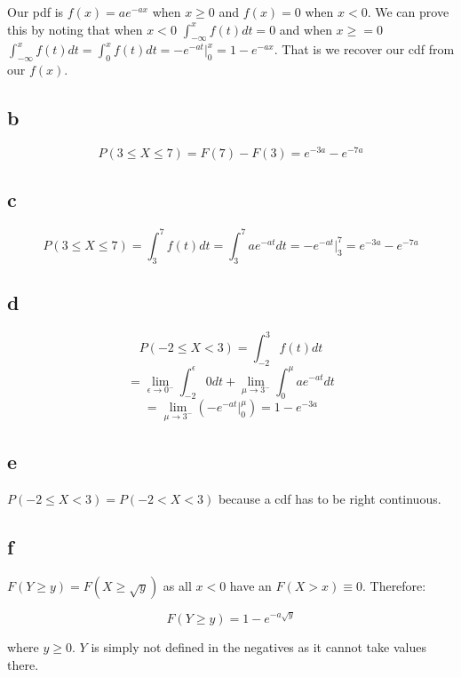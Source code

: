 \documentclass[11pt]{article}
\begin{document}
Our pdf is $f(x) = ae^{-ax}$ when $x\geq 0$ and $f(x) = 0$ when $x<0$. We can prove this by noting that when $x<0$ $\int_{-\infty}^x f(t)dt=0$ and when $x\geq = 0$ $\int_{-\infty}^x f(t)dt = \int_{0}^x f(t)dt = -e^{-at} |_0^{x} = 1 - e^{-ax}$. That is we recover our cdf from our $f(x)$. 

\subsection{b}

$$P(3 \leq X \leq 7) = F(7) - F(3) = e^{-3a}-e^{-7a}$$

\subsection{c}

$$P(3 \leq X \leq 7) = \int_3^7 f(t)dt = \int_3^7 ae^{-at} dt = -e^{-at}\Big|_3^{7}=e^{-3a}-e^{-7a}$$

\subsection{d}

$$P(-2 \leq X < 3) = \int_{-2}^3 f(t)dt$$ 
$$ = \lim_{\epsilon \rightarrow 0^-}\int_{-2}^{\epsilon} 0dt + \lim_{\mu \rightarrow 3^-}\int_0^{\mu} ae^{-at} dt $$
$$= \lim_{\mu \rightarrow  3^-} \left( -e^{-at}\Big|_0^{\mu} \right)=1-e^{-3a}$$

\subsection{e}

$P(-2 \leq X < 3) = P(-2 < X < 3)$ because a cdf has to be right continuous. 

\subsection{f}


$F(Y \geq y) = F(X \geq \sqrt{y})$ as all $x<0$ have an $F(X>x)\equiv 0$. Therefore:

$$F(Y \geq y) = 1-e^{-a\sqrt{y}}$$

where $y \geq 0$. $Y$ is simply not defined in the negatives as it cannot take values there. 
\end{document}
